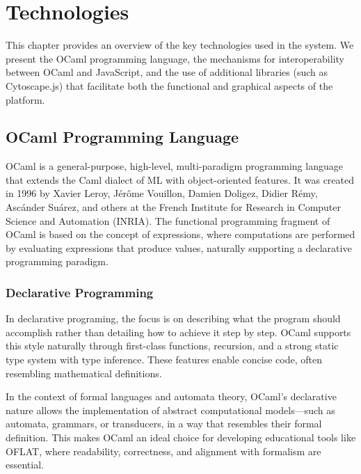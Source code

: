 
%

\chapter{Technologies}
\label{cha:technologies}

This chapter provides an overview of the key technologies used in the system. We present
the OCaml programming language, the mechanisms for interoperability between OCaml and JavaScript, 
and the use of additional libraries (such as Cytoscape.js) that facilitate both the functional and graphical aspects of
the platform.

\section{OCaml Programming Language}

OCaml is a general-purpose, high-level, multi-paradigm programming language that
extends the Caml dialect of ML with object-oriented features. It was created in 1996 by
Xavier Leroy, Jérôme Vouillon, Damien Doligez, Didier Rémy, Ascánder Suárez, and others
at the French Institute for Research in Computer Science and Automation (INRIA). The
functional programming fragment of OCaml is based on the concept of expressions, where
computations are performed by evaluating expressions that produce values, naturally
supporting a declarative programming paradigm. \cite{ocaml_about}

\subsection{Declarative Programming}
In declarative programing\cite{declarative-programming}, the focus is on describing what the program should accomplish rather than detailing how to achieve it step by step. 
OCaml supports this style naturally through first-class functions, recursion, and a strong static type system with type inference. 
These features enable concise code, often resembling mathematical definitions. 

In the context of formal languages and automata theory, 
OCaml's declarative nature allows the implementation of abstract computational models—such as automata, grammars, 
or transducers, in a way that resembles their formal definition. This makes OCaml an ideal choice for developing educational tools like OFLAT, 
where readability, correctness, and alignment with formalism are essential.

